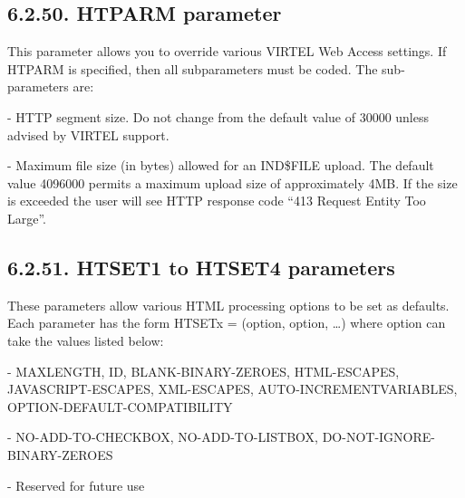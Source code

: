 \documentclass[letterpaper,10pt,english]{sphinxmanual}
\begin{document}
\subsection{6.2.50. HTPARM parameter}
\label{\detokenize{Installation_Guide:htparm-parameter}}
\begin{sphinxVerbatim}[commandchars=\\\{\}]
                 
\end{sphinxVerbatim}

This parameter allows you to override various VIRTEL Web Access settings. If HTPARM is specified, then all subparameters must be coded. The sub-parameters are:

 - HTTP segment size. Do not change from the default value of 30000 unless advised by VIRTEL support.

 - Maximum file size (in bytes) allowed for an IND\$FILE upload. The default value 4096000 permits a maximum upload size of approximately 4MB. If the size is exceeded the user will see HTTP response code “413 Request Entity Too Large”.


\subsection{6.2.51. HTSET1 to HTSET4 parameters}
\label{\detokenize{Installation_Guide:htset1-to-htset4-parameters}}
\begin{sphinxVerbatim}[commandchars=\\\{\}]
          
\end{sphinxVerbatim}

These parameters allow various HTML processing options to be set as defaults. Each parameter has the form HTSETx = (option, option, …) where option can take the values listed below:

 - MAXLENGTH, ID, BLANK-BINARY-ZEROES, HTML-ESCAPES, JAVASCRIPT-ESCAPES, XML-ESCAPES, AUTO-INCREMENTVARIABLES, OPTION-DEFAULT-COMPATIBILITY

 - NO-ADD-TO-CHECKBOX, NO-ADD-TO-LISTBOX, DO-NOT-IGNORE-BINARY-ZEROES

 - Reserved for future use
\end{document}
